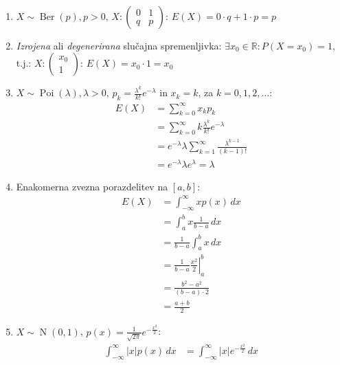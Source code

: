 \documentclass[12pt]{book}
\theoremstyle{definition}
\theoremstyle{plain}
\theoremstyle{plain}
\theoremstyle{plain}
\theoremstyle{remark}
\begin{document}
\begin{zgled}
    ~
    
    \begin{enumerate}
        \item $X \sim \operatorname{Ber}(p), p >0$, $X:\left(\begin{array}{cc} 0 & 1 \\ q & p \end{array}\right)$: $E(X)=0 \cdot q+1 \cdot p=p$
        \item \emph{Izrojena} ali \emph{degenerirana} slučajna spremenljivka: $\exists x_0 \in \mathbb{R}: P\left(X=x_0\right)=1$, t.j.: $X:\left(\begin{array}{c} x_0 \\ 1 \end{array}\right)$: $E(X)=x_0 \cdot 1=x_0$
        \item $X \sim \operatorname{Poi}(\lambda), \lambda >0$, $p_k=\frac{\lambda^k}{k !}  e^{-\lambda}$ in $x_k = k$, za $k=0, 1, 2, \ldots$:
        $$
        \begin{aligned}
            E(X)&=\sum_{k=0}^{\infty} x_k p_k \\
            &=\sum_{k=0}^{\infty} k \frac{\lambda^k}{k !}  e^{-\lambda} \\
            &=e^{-\lambda} \lambda \sum_{k=1}^{\infty} \frac{\lambda^{k-1}}{(k-1) !} \\ 
            &= e^{-\lambda} \lambda e^\lambda=\lambda
        \end{aligned}
        $$
        \item Enakomerna zvezna porazdelitev na $[a, b]$:
        $$
        \begin{aligned}
            E(X)&=\int_{-\infty}^{\infty} x p(x) \, d x \\
            &=\int_a^b x \frac{1}{b-a} \, d x \\
            &=\frac{1}{b-a} \int_a^b x \,d x \\
            &=\left.\frac{1}{b-a} \frac{x^2}{2}\right|_a ^b \\
            &=\frac{b^2-a^2}{(b-a) \cdot 2} \\
            &=\frac{a+b}{2}
        \end{aligned}
        $$
        \item $X \sim \operatorname{N}(0,1)$, $p(x)=\frac{1}{\sqrt{2 \pi}} e^{-\frac{x^2}{2}}$:
        \begin{align*}
            \int_{-\infty}^{\infty}|x| p(x) \, d x &= \int_{-\infty}^{\infty}|x| e^{-\frac{x^2}{2}} \, d x \\

\end{align*}
\end{enumerate}
\end{zgled}
\end{document}
